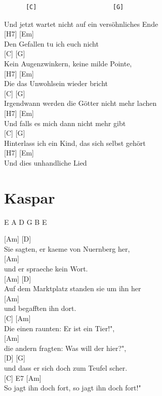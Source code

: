 \documentclass[
  letterpaper,
]{scrbook}
\begin{document}
\begin{verbatim}
      [C]                     [G]
\end{verbatim}

Und jetzt wartet nicht auf ein versöhnliches Ende\\
{[}H7{]} {[}Em{]}\\
Den Gefallen tu ich euch nicht\\
{[}C{]} {[}G{]}\\
Kein Augenzwinkern, keine milde Pointe,\\
{[}H7{]} {[}Em{]}\\
Die das Unwohlsein wieder bricht\\
{[}C{]} {[}G{]}\\
Irgendwann werden die Götter nicht mehr lachen\\
{[}H7{]} {[}Em{]}\\
Und falls es mich dann nicht mehr gibt\\
{[}C{]} {[}G{]}\\
Hinterlass ich ein Kind, das sich selbst gehört\\
{[}H7{]} {[}Em{]}\\
Und dies unhandliche Lied

\hypertarget{kaspar}{%
\chapter{Kaspar}\label{kaspar}}

E A D G B E

{[}Am{]} {[}D{]}\\
Sie sagten, er kaeme von Nuernberg her,\\
{[}Am{]}\\
und er spraeche kein Wort.\\
{[}Am{]} {[}D{]}\\
Auf dem Marktplatz standen sie um ihn her\\
{[}Am{]}\\
und begafften ihn dort.\\
{[}C{]} {[}Am{]}\\
Die einen raunten: Er ist ein Tier!",\\
{[}Am{]}\\
die andern fragten: Was will der hier?",\\
{[}D{]} {[}G{]}\\
und dass er sich doch zum Teufel scher\textquotesingle.\\
{[}C{]} E7 {[}Am{]}\\
So jagt ihn doch fort, so jagt ihn doch fort!"
\end{document}
